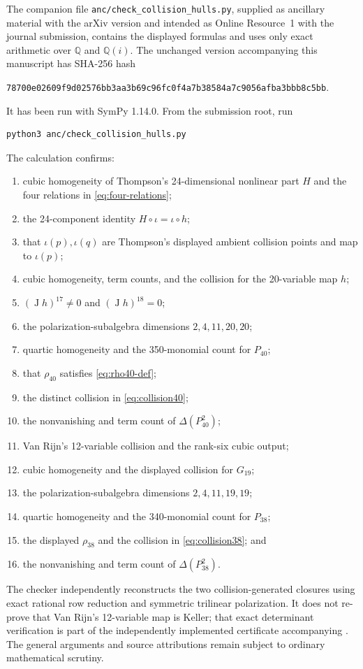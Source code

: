 \documentclass[11pt]{article}
\theoremstyle{remark}
\DeclareMathOperator{\J}{J}
\newcommand{\Q}{\mathbb{Q}}
\begin{document}
The companion file \texttt{anc/check\_collision\_hulls.py}, supplied as ancillary material with the arXiv version and intended as Online Resource~1 with the journal submission, contains the displayed formulas and uses only exact arithmetic over $\Q$ and $\Q(i)$. The unchanged version accompanying this manuscript has SHA-256 hash
\begin{center}
\texttt{78700e02609f9d02576bb3aa3b69c96fc0f4a7b38584a7c9056afba3bbb8c5bb}.
\end{center}
It has been run with SymPy 1.14.0. From the submission root, run
\begin{verbatim}
python3 anc/check_collision_hulls.py
\end{verbatim}
The calculation confirms:
\begin{enumerate}[label=\arabic*.]
\item cubic homogeneity of Thompson's 24-dimensional nonlinear part $H$ and the four relations in \eqref{eq:four-relations};
\item the 24-component identity $H\circ\iota=\iota\circ h$;
\item that $\iota(p),\iota(q)$ are Thompson's displayed ambient collision points and map to $\iota(p)$;
\item cubic homogeneity, term counts, and the collision for the 20-variable map $h$;
\item $(\J h)^{17}\ne0$ and $(\J h)^{18}=0$;
\item the polarization-subalgebra dimensions $2,4,11,20,20$;
\item quartic homogeneity and the 350-monomial count for $P_{40}$;
\item that $\rho_{40}$ satisfies \eqref{eq:rho40-def};
\item the distinct collision in \eqref{eq:collision40};
\item the nonvanishing and term count of $\Delta(P_{40}^2)$;
\item Van Rijn's 12-variable collision and the rank-six cubic output;
\item cubic homogeneity and the displayed collision for $G_{19}$;
\item the polarization-subalgebra dimensions $2,4,11,19,19$;
\item quartic homogeneity and the 340-monomial count for $P_{38}$;
\item the displayed $\rho_{38}$ and the collision in \eqref{eq:collision38}; and
\item the nonvanishing and term count of $\Delta(P_{38}^2)$.
\end{enumerate}
The checker independently reconstructs the two collision-generated closures using exact rational row reduction and symmetric trilinear polarization. It does not re-prove that Van Rijn's 12-variable map is Keller; that exact determinant verification is part of the independently implemented certificate accompanying \citet{vanRijn12var2026}. The general arguments and source attributions remain subject to ordinary mathematical scrutiny.
\end{document}
